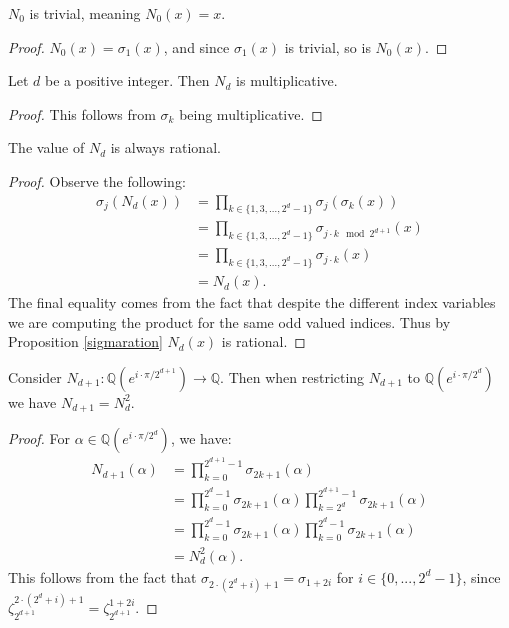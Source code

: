\documentclass[12pt]{dalthesis}
\begin{document}
\begin{proposition}
$N_0$ is trivial, meaning $N_0(x) = x$.
\end{proposition}
\begin{proof}
$N_0 (x) = \sigma_1 (x)$, and since $\sigma_1 (x)$ is trivial, so is $N_0 (x)$.
\end{proof}

\begin{proposition}
\label{N_dMultiplicative}
Let $d$ be a positive integer. Then $N_d$ is multiplicative.
\end{proposition}
\begin{proof}
This follows from $\sigma_k$ being multiplicative.
\end{proof}

\begin{proposition}
\label{N_dRation}
The value of $N_d$ is always rational.
\end{proposition}
\begin{proof}
Observe the following:
\begin{equation*}
\begin{split}
\sigma_j (N_d(x)) & = \prod\limits_{k \in \{1, 3, \dots , 2^d-1\}} \sigma_j (\sigma_k (x)) \\
& = \prod\limits_{k \in \{1, 3, \dots , 2^d-1\}} \sigma_{j\cdot k \mod 2^{d+1}} (x) \\
& = \prod\limits_{k \in \{1, 3, \dots , 2^d-1\}} \sigma_{j\cdot k} (x) \\
& = N_d(x).
\end{split}
\end{equation*}
The final equality comes from the fact that despite the different index variables we are computing the product for the same odd valued indices. Thus by Proposition \ref{sigmaration} $N_d(x)$ is rational.
\end{proof}

\begin{proposition}
Consider $N_{d+1}: \mathbb{Q}(e^{i\cdot \pi / 2^{d+1}}) \longrightarrow \mathbb{Q}$. Then when restricting $N_{d+1}$ to $\mathbb{Q}(e^{i\cdot \pi / 2^{d}})$ we have $N_{d+1} = N_d^2$.
\end{proposition}
\begin{proof}
For $\alpha \in \mathbb{Q}(e^{i\cdot \pi / 2^{d}})$, we have:
\begin{equation*}
\begin{split}
N_{d+1}(\alpha) & = \prod_{k=0}^{2^{d+1} - 1} \sigma_{2k+1} (\alpha) \\
& = \prod_{k=0}^{2^{d} - 1} \sigma_{2k+1} (\alpha) \prod_{k=2^{d}}^{2^{d+1} - 1} \sigma_{2k+1} (\alpha) \\
& = \prod_{k=0}^{2^{d} - 1} \sigma_{2k+1} (\alpha) \prod_{k=0}^{2^{d} - 1} \sigma_{2k+1} (\alpha) \\
& = N_d^2 (\alpha).
\end{split}
\end{equation*}
This follows from the fact that $\sigma_{2\cdot (2^d+i) + 1} = \sigma_{1+2i}$ for $i \in \{0, ..., 2^d - 1\}$, since $\zeta_{2^{d+1}}^{2\cdot (2^d+i) + 1} = \zeta_{2^{d+1}}^{1+2i}$.
\end{proof}
\end{document}
